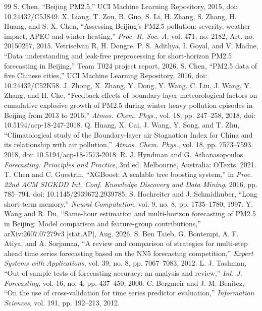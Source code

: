 \documentclass[conference]{IEEEtran}
\begin{document}
\begin{thebibliography}{99}
 S. Chen, ``Beijing PM2.5,'' UCI Machine Learning Repository, 2015, doi: 10.24432/C5JS49.
 X. Liang, T. Zou, B. Guo, S. Li, H. Zhang, S. Zhang, H. Huang, and S. X. Chen, ``Assessing Beijing's PM2.5 pollution: severity, weather impact, APEC and winter heating,'' \emph{Proc. R. Soc. A}, vol. 471, no. 2182, Art. no. 20150257, 2015.
 Vetriselvan R, H. Dongre, P. S. Adithya, I. Goyal, and V. Madne, ``Data understanding and leak-free preprocessing for short-horizon PM2.5 forecasting in Beijing,'' Team T024 project report, 2026.
 S. Chen, ``PM2.5 data of five Chinese cities,'' UCI Machine Learning Repository, 2016, doi: 10.24432/C52K58.
 J. Zhong, X. Zhang, Y. Dong, Y. Wang, C. Liu, J. Wang, Y. Zhang, and H. Che, ``Feedback effects of boundary-layer meteorological factors on cumulative explosive growth of PM2.5 during winter heavy pollution episodes in Beijing from 2013 to 2016,'' \emph{Atmos. Chem. Phys.}, vol. 18, pp. 247--258, 2018, doi: 10.5194/acp-18-247-2018.
 Q. Huang, X. Cai, J. Wang, Y. Song, and T. Zhu, ``Climatological study of the Boundary-layer air Stagnation Index for China and its relationship with air pollution,'' \emph{Atmos. Chem. Phys.}, vol. 18, pp. 7573--7593, 2018, doi: 10.5194/acp-18-7573-2018.
 R. J. Hyndman and G. Athanasopoulos, \emph{Forecasting: Principles and Practice}, 3rd ed. Melbourne, Australia: OTexts, 2021.
 T. Chen and C. Guestrin, ``XGBoost: A scalable tree boosting system,'' in \emph{Proc. 22nd ACM SIGKDD Int. Conf. Knowledge Discovery and Data Mining}, 2016, pp. 785--794, doi: 10.1145/2939672.2939785.
 S. Hochreiter and J. Schmidhuber, ``Long short-term memory,'' \emph{Neural Computation}, vol. 9, no. 8, pp. 1735--1780, 1997.
 Y. Wang and R. Du, ``Same-hour estimation and multi-horizon forecasting of PM2.5 in Beijing: Model comparison and feature-group contributions,'' arXiv:2607.07279v3 [stat.AP], Aug. 2026.
 S. Ben Taieb, G. Bontempi, A. F. Atiya, and A. Sorjamaa, ``A review and comparison of strategies for multi-step ahead time series forecasting based on the NN5 forecasting competition,'' \emph{Expert Systems with Applications}, vol. 39, no. 8, pp. 7067--7083, 2012.
 L. J. Tashman, ``Out-of-sample tests of forecasting accuracy: an analysis and review,'' \emph{Int. J. Forecasting}, vol. 16, no. 4, pp. 437--450, 2000.
 C. Bergmeir and J. M. Ben\'{i}tez, ``On the use of cross-validation for time series predictor evaluation,'' \emph{Information Sciences}, vol. 191, pp. 192--213, 2012.

\end{thebibliography}
\end{document}
